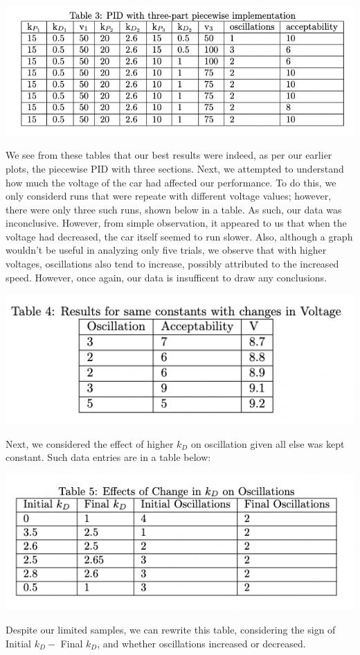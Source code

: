 \documentclass[12pt]{article}
\begin{document}
\begin{multicols}{2}
\begin{center}
\end{center}
\begin{center}
    \includegraphics*[scale=0.5]{Table3.png}
\end{center}

We see from these tables that our best results were indeed, as per our earlier plots, the piecewise PID with three sections. \newline
Next, we attempted to understand how much the voltage of the car had affected our performance. To do this, we only considerd runs that were repeate with different voltage values; however, there were only three such runs, shown below in a table.
As such, our data was inconclusive. However, from simple observation, it appeared to us that when the voltage had decreased, the car itself seemed to run slower. 
Also, although a graph wouldn't be useful in analyzing only five trials, we observe that with higher voltages, oscillations also tend to increase, possibly attributed to the increased speed. However, once again, our data is insufficent to draw any conclusions.
\begin{center}
    \includegraphics*[scale=0.5]{Table4.png}
\end{center}
Next, we considered the effect of higher $k_D$ on oscillation given all else was kept constant. Such data entries are in a table below:
\begin{center}
    \includegraphics*[scale=0.5]{Table5.png}
\end{center}
Despite our limited samples, we can rewrite this table, considering the sign of Initial $k_D -$ Final $k_D$, and whether oscillations increased or decreased. 


\end{multicols}
\end{document}
